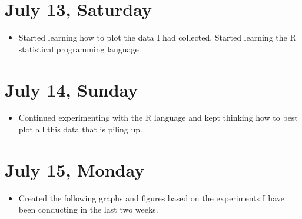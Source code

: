 \documentclass[a4paper,12pt]{article}
\begin{document}
\section{July 13, Saturday}
\begin{itemize}
	\item Started learning how to plot the data I had collected. Started learning the R statistical programming language.
\end{itemize}

\section{July 14, Sunday}
\begin{itemize}
	\item Continued experimenting with the R language and kept thinking how to best plot all this data that is piling up.
\end{itemize}

\section{July 15, Monday}
\begin{itemize}
	\item Created the following graphs and figures based on the experiments I have been conducting in the last two weeks.
\end{itemize}
\end{document}
